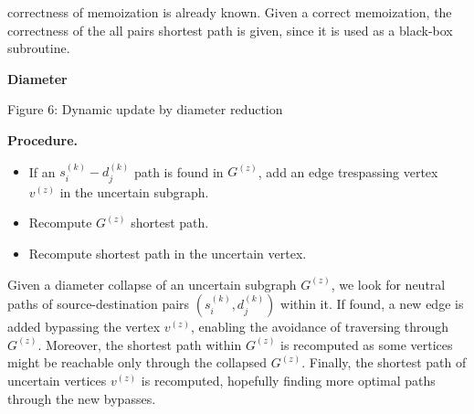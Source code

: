correctness of memoization is already known. Given a correct memoization, the correctness of the all pairs shortest path is given, since it is used as a black-box subroutine.


\textbf{Diameter}

\begin{center}
    
    Figure 6: Dynamic update by diameter reduction
\end{center}

\textbf{Procedure.}
\begin{itemize}
    \item If an $s_i^{(k)}-d_j^{(k)}$ path is found in $G^{(z)}$, add an edge trespassing vertex $v^{(z)}$ in the uncertain subgraph.
    \item Recompute $G^{(z)}$ shortest path.
    \item Recompute shortest path in the uncertain vertex.
\end{itemize}

Given a diameter collapse of an uncertain subgraph $G^{(z)}$, we look for neutral paths of source-destination pairs $(s_i^{(k)}, d_j^{(k)})$ within it. If found, a new edge is added bypassing the vertex $v^{(z)}$, enabling the avoidance of traversing through $G^{(z)}$. Moreover, the shortest path within $G^{(z)}$ is recomputed as some vertices might be reachable only through the collapsed $G^{(z)}$. Finally, the shortest path of uncertain vertices $v^{(z)}$ is recomputed, hopefully finding more optimal paths through the new bypasses.

